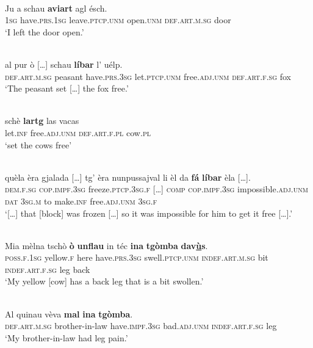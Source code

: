 \ea\label{ex:noagr:2}
\\
\gll Ju a schau \textbf{aviart} agl ésch.   \\
 \textsc{1sg} have.\textsc{prs.1sg} leave.\textsc{ptcp.unm} open.\textsc{unm} \textsc{def.art.m.sg} door\\
\glt `I left the door open.'
\z

\ea\label{ex:noagr:3}
\\
\gll    [...] al pur ò […] schau \textbf{líbar} l’ uélp.\\
     {} \textsc{def.art.m.sg} peasant have.\textsc{prs.3sg} {} let.\textsc{ptcp.unm} free.\textsc{adj.unm} \textsc{def.art.f.sg} fox\\
\glt `The peasant set […] the fox free.'
\z

\ea
\label{}
\\
\gll schè \textbf{lartg} las vacas\\
let.\textsc{inf} free.\textsc{adj.unm} \textsc{def.art.f.pl} cow.\textsc{pl}\\
\glt `set the cows free'
\z

\ea
\label{ex:noagr:4}
\\
\gll   […] quèla èra gjalada […] tg' èra nunpussajval li èl da \textbf{fá} \textbf{líbar} èla […].\\
      {} \textsc{dem.f.sg} \textsc{cop.impf.3sg} freeze.\textsc{ptcp.3sg.f} […] \textsc{comp} \textsc{cop.impf.3sg} impossible.\textsc{adj.unm} \textsc{dat} \textsc{3sg.m} to make.\textsc{inf} free.\textsc{adj.unm} \textsc{3sg.f}\\
\glt `[…] that [block] was frozen […] so it was impossible for him to get it free […].'
\z

\ea\label{ex:noagr:5}
\\
\gll  Mia mèlna tschò \textbf{ò} \textbf{unflau} in téc \textbf{ina} \textbf{tgòmba} \textbf{dav\underline{ù}s}.  \\
     \textsc{poss.f.1sg} yellow.\textsc{f} here have.\textsc{prs.3sg} swell.\textsc{ptcp.unm}  \textsc{indef.art.m.sg} bit \textsc{indef.art.f.sg} leg back\\
\glt `My yellow [cow] has a back leg that is a bit swollen.'
\z

\ea
\label{ex:noagr:6}
\\
\gll   Al quinau vèva \textbf{mal} \textbf{ina} \textbf{tgòmba}. \\
\textsc{def.art.m.sg} brother-in-law have.\textsc{impf.3sg} bad.\textsc{adj.unm} \textsc{indef.art.f.sg} leg \\
\glt `My brother-in-law had leg pain.'
\z

